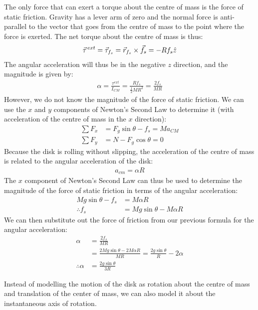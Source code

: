 \begin{example}
The only force that can exert a torque about the centre of mass is the force of static friction. Gravity has a lever arm of zero and the normal force is anti-parallel to the vector that goes from the centre of mass to the point where the force is exerted. The net torque about the centre of mass is thus:
\begin{align*}
\pvec\tau^{ext} = \vec \tau_{f_s} = \vec r_{f_s}\times \vec f_s= -Rf_s\hat z
\end{align*}
The angular acceleration will thus be in the negative $z$ direction, and the magnitude is given by:
\begin{align*}
\alpha = \frac{\tau^{ext}}{I_{CM}}=\frac{Rf_s}{\frac{1}{2}MR^2}=\frac{2f_s}{MR}
\end{align*} 
However, we do not know the magnitude of the force of static friction. We can use the $x$ and $y$ components of Newton's Second Law to determine it (with acceleration of the centre of mass in the $x$ direction):
\begin{align*}
\sum F_x &= F_g\sin\theta - f_s = Ma_{CM}\\
\sum F_y &= N - F_g\cos\theta = 0
\end{align*}
Because the disk is rolling without slipping, the acceleration of the centre of mass is related to the angular acceleration of the disk:
\begin{align*}
a_{cm} = \alpha R
\end{align*}
The $x$ component of Newton's Second Law can thus be used to determine the magnitude of the force of static friction in terms of the angular acceleration:
\begin{align*}
Mg\sin\theta - f_s &= M \alpha R\\
\therefore f_s &= Mg\sin\theta - M\alpha R
\end{align*}
We can then substitute out the force of friction from our previous formula for the angular acceleration:
\begin{align*}
\alpha &= \frac{2f_s}{MR}\\
&=\frac{2Mg\sin\theta - 2M\alpha R}{MR} = \frac{2g\sin\theta}{R} - 2\alpha \\
\therefore \alpha &= \frac{2g\sin\theta}{3R}
\end{align*}

Instead of modelling the motion of the disk  as rotation about the centre of mass and translation of the center of mass, we can also model it about the instantaneous axis of rotation.


\end{example}
